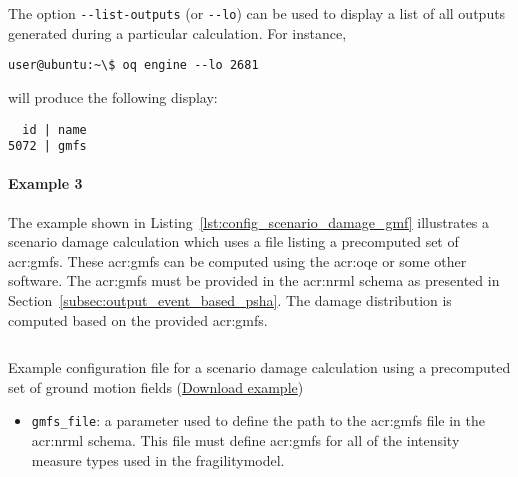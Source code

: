The option \Verb+--list-outputs+ (or \Verb+--lo+) can be used to display a
list of all outputs generated during a particular calculation. For instance,

\begin{verbatim}
user@ubuntu:~\$ oq engine --lo 2681
\end{verbatim}

will produce the following display:

\begin{verbatim}
  id | name
5072 | gmfs
\end{verbatim}


\paragraph{Example 3}

The example shown in Listing~\ref{lst:config_scenario_damage_gmf} illustrates
a scenario damage calculation which uses a file listing a precomputed set of
\glspl{acr:gmf}. These \glspl{acr:gmf} can be computed using the
\glsdesc{acr:oqe} or some other software. The \glspl{acr:gmf} must be provided
in the \gls{acr:nrml} schema as presented in
Section~\ref{subsec:output_event_based_psha}. The damage distribution is
computed based on the provided \glspl{acr:gmf}.

\begin{listing}[htbp]
  \inputminted[firstline=1,firstnumber=1,fontsize=\footnotesize,frame=single,linenos,bgcolor=lightgray,label=job.ini]{ini}{oqum/risk/verbatim/config_scenario_damage_gmf.ini}
  \caption{Example configuration file for a scenario damage calculation using a precomputed set of ground motion fields (\href{https://raw.githubusercontent.com/GEMScienceTools/oq-engine-docs/master/oqum/risk/verbatim/config_scenario_damage_gmf.ini}{Download example})}
  \label{lst:config_scenario_damage_gmf}
\end{listing}

\begin{itemize}

  \item \Verb+gmfs_file+: a parameter used to define the path
	  to the \glspl{acr:gmf} file in the \gls{acr:nrml} schema. This file must
    define \glspl{acr:gmf} for all of the intensity measure types used in the
    \gls{fragilitymodel}.

\end{itemize}

